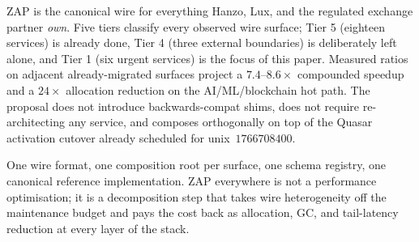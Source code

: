 ZAP is the canonical wire for everything Hanzo, Lux, and the regulated exchange partner
\emph{own}. Five tiers classify every observed wire surface; Tier 5
(eighteen services) is already done, Tier 4 (three external boundaries)
is deliberately left alone, and Tier 1 (six urgent services) is the
focus of this paper. Measured ratios on adjacent already-migrated
surfaces project a $7.4$--$8.6\times$ compounded speedup and a
$24\times$ allocation reduction on the AI/ML/blockchain hot path. The
proposal does not introduce backwards-compat shims, does not require
re-architecting any service, and composes orthogonally on top of the
Quasar activation cutover already scheduled for unix~$1766708400$.

One wire format, one composition root per surface, one schema registry,
one canonical reference implementation. ZAP everywhere is not a
performance optimisation; it is a decomposition step that takes wire
heterogeneity off the maintenance budget and pays the cost back as
allocation, GC, and tail-latency reduction at every layer of the stack.
